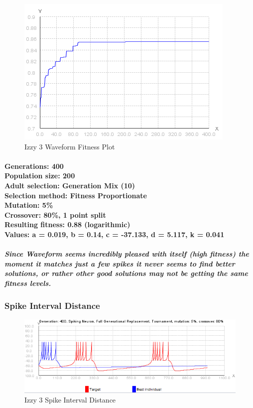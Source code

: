 \documentclass[titlepage,norsk]{article}
\begin{document}
\begin{figure}[h!]
\centering
\includegraphics[scale=0.75]{izzy3waveFitness.png}
\caption{Izzy 3 Waveform Fitness Plot}
\label{fig:awesome_image}
\end{figure}

\paragraph{
Generations: 400\\
Population size: 200\\
Adult selection: Generation Mix (10) \\
Selection method: Fitness Proportionate \\
Mutation: 5\% \\
Crossover: 80\%, 1 point split \\
Resulting fitness: 0.88 (logarithmic) \\
Values: a = 0.019, b = 0.14, c = -37.133, d = 5.117, k = 0.041 \\
}

\subparagraph{Since Waveform seems incredibly pleased with itself (high fitness) the moment it matches just a few spikes it never seems to find better solutions, or rather other good solutions may not be getting the same fitness levels.}

\subsubsection{Spike Interval Distance}

\begin{figure}[h!]
\centering
\includegraphics[scale=0.75]{izzy3interval.png}
\caption{Izzy 3 Spike Interval Distance}
\label{fig:awesome_image}
\end{figure}
\end{document}
